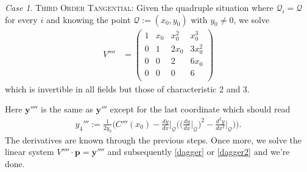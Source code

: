\documentclass[english,11pt,a4paper]{article}
\theoremstyle{definition}
\theoremstyle{remark}
\theoremstyle{case}
\newtheorem{case}{Case}
\newcommand{\q}{\mathcal{Q}}
\begin{document}
\begin{case}
	{\scshape Third Order Tangential:} Given the quadruple situation where $\q_i = \q$ for every $i$ and knowing the point $\q := (x_0,y_0)$ with $y_0 \neq 0$, we solve
	\begin{align*}V'''' &=
		\begin{pmatrix}
			1 & x_0 & x_0^2 & x_0^3\\
			0 & 1 & 2 x_0 & 3 x_0^2\\
			0 & 0 & 2 & 6x_0\\
			0 & 0 & 0 & 6\\
		\end{pmatrix}
	\end{align*}
	which is invertible in all fields but those of characteristic 2 and 3.

	Here $\mathbf{y}''''$ is the same as $\mathbf{y}'''$ except for the last coordinate which should read
	\begin{align*}
		y_4''' := \frac{1}{2y_0}\Big( C'''(x_0) - \frac{dy}{dx}\bigg|_{\q}\Big(\big(\frac{dy}{dx}\bigg|_{\q}\big)^2 - \frac{d^2y}{dx^2}\bigg|_{\q} \Big) \Big).
	\end{align*}
	The derivatives are known through the previous steps. Once more, we solve the linear system $V'''' \cdot \mathbf{p}=\mathbf{y''''}$ and subsequently \eqref{dagger} or \eqref{dagger2} and we're done.
\end{case}



\end{document}
